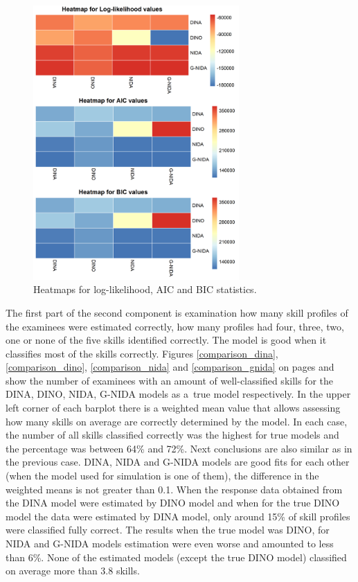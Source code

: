 \documentclass[english]{pwr_wmat_praca_dyplomowa}
\theoremstyle{plain}
\numberwithin{theorem}{chapter}
\theoremstyle{definition}
\numberwithin{theorem}{chapter}
\begin{document}
	\begin{figure}[ht]
		\centering
		\includegraphics[width=0.7\textwidth]{Heatmaps_relative_fit.png}
		\caption{Heatmaps for log-likelihood, AIC and BIC statistics.}
		\label{heatmap_stats}
	\end{figure}
	
	The first part of the second component is examination how many skill profiles of the examinees were estimated correctly, how many profiles had four, three, two, one or none of the five skills identified correctly. The model is good when it classifies most of the skills correctly. Figures \ref{comparison_dina}, \ref{comparison_dino}, \ref{comparison_nida} and \ref{comparison_gnida} on pages \pageref{comparison_dina} and \pageref{comparison_gnida} show the number of examinees with an amount of well-classified skills for the DINA, DINO, NIDA, G-NIDA models as a~true model respectively. In the upper left corner of each barplot there is a weighted mean value that allows assessing how many skills on average are correctly determined by the model. In each case, the number of all skills classified correctly was the highest for true models and the percentage was between 64\% and 72\%. Next conclusions are also similar as in the previous case. DINA, NIDA and G-NIDA models are good fits for each other (when the model used for simulation is one of them), the difference in the weighted means is not greater than 0.1. When the response data obtained from the DINA model were estimated by DINO model and when for the true DINO model the data were estimated by DINA model, only around 15\% of skill profiles were classified fully correct. The results when the true model was DINO, for NIDA and G-NIDA models estimation were even worse and amounted to less than 6\%. None of the estimated models (except the true DINO model) classified on average more than 3.8 skills.
	
\end{document}
